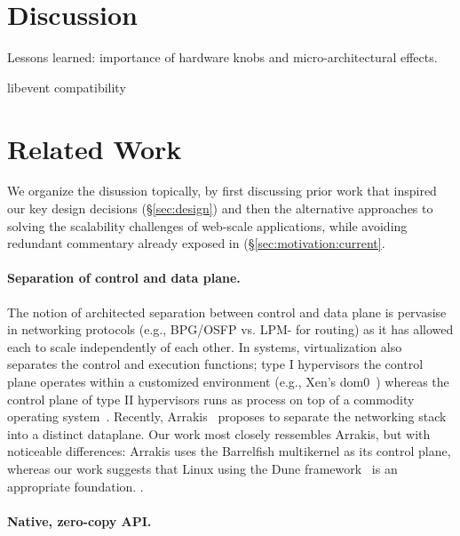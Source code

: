 

\section{Discussion}

\todo Lessons learned: importance of hardware knobs and micro-architectural effects.

\todo libevent compatibility


\section{Related Work}

We organize the disussion topically, by first discussing prior work
that inspired our key design decisions (\S\ref{sec:design}) and then
the alternative approaches to solving the scalability challenges of
web-scale applications, while avoiding redundant commentary already
exposed in (\S\ref{sec:motivation:current}.


\paragraph{Separation of control and data plane.}

The notion of architected separation between control and data plane is
pervasise in networking protocols (e.g., BPG/OSFP vs. LPM- for
routing) as it has allowed each to scale independently of each other.
In systems, virtualization also separates the control and execution
functions; type I hypervisors the control plane operates within a
customized environment (e.g., Xen's
dom0~\cite{DBLP:conf/sosp/BarhamDFHHHN03}) whereas the control plane
of type II hypervisors runs as process on top of a commodity operating
system~\cite{DBLP:journals/tocs/BugnionDRSW12}.  Recently,
Arrakis~\cite{peter2013arrakis,arrakisTR13} proposes to separate the
networking stack into a distinct dataplane.  Our work most closely
ressembles Arrakis, but with noticeable differences: Arrakis uses the
Barrelfish multikernel as its control plane, whereas our work suggests
that Linux using the Dune framework~\cite{belay2012dune} is an
appropriate foundation.  .


\paragraph{Native, zero-copy API.}


